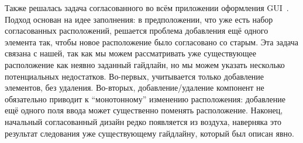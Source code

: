 
Также решалась задача согласованного во всём приложении оформления GUI~\cite{LearningGUI}. Подход основан на идее заполнения:
в предположении, что уже есть набор согласованных расположений, решается проблема добавления ещё одного элемента так, чтобы новое расположение было согласовано со старым. Эта задача связана с нашей, так как мы можем рассматривать уже существующее расположение как неявно заданный гайдлайн, но мы можем указать несколько потенциальных недостатков. Во-первых,  учитывается только добавление элементов, без удаления. Во-вторых, добавление/удаление компонент не обязательно приводит к \enquote{монотонному} изменению расположения: добавление ещё одного поля ввода может существенно поменять расположение. Наконец, начальный согласованный дизайн редко появляется из воздуха, наверняка это результат следования уже существующему гайдлайну, который был описан явно.

